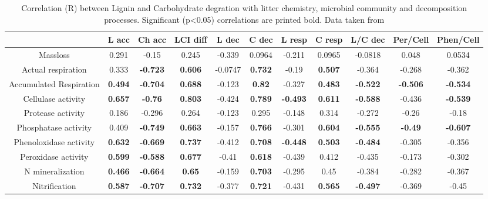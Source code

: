 \documentclass[authoryear,preprint,review,12pt]{elsarticle}
\begin{document}
\begin{table}[h!]
\begin{center}
\caption{Correlation (R) between Lignin and Carbohydrate degration with litter chemistry, microbial community and decomposition processes. Significant (p<0.05) correlations are printed bold. Data taken from \cite{Mooshammer2011, Leitner2011}}
\label{corrtable}
{\tiny
\begin{tabular}{ccccccccccc}
  \hline
 & L acc & Ch acc & LCI diff & L dec & C dec & L resp & C resp & L/C dec & Per/Cell & Phen/Cell \\ 
  \hline
Massloss & 0.291 & -0.15 & 0.245 & -0.339 & 0.0964 & -0.211 & 0.0965 & -0.0818 & 0.048 & 0.0534 \\ 
  Actual respiration & 0.333 & \textbf{ -0.723 } & \textbf{ 0.606 } & -0.0747 & \textbf{ 0.732 } & -0.19 & \textbf{ 0.507 } & -0.364 & -0.268 & -0.362 \\ 
  Accumulated Respiration & \textbf{ 0.494 } & \textbf{ -0.704 } & \textbf{ 0.688 } & -0.123 & \textbf{ 0.82 } & -0.327 & \textbf{ 0.483 } & \textbf{ -0.522 } & \textbf{ -0.506 } & \textbf{ -0.534 } \\ 
  Cellulase activity & \textbf{ 0.657 } & \textbf{ -0.76 } & \textbf{ 0.803 } & -0.424 & \textbf{ 0.789 } & \textbf{ -0.493 } & \textbf{ 0.611 } & \textbf{ -0.588 } & -0.436 & \textbf{ -0.539 } \\ 
  Protease activity & 0.186 & -0.296 & 0.264 & -0.123 & 0.295 & -0.148 & 0.314 & -0.272 & -0.26 & -0.18 \\ 
  Phosphatase activity & 0.409 & \textbf{ -0.749 } & \textbf{ 0.663 } & -0.157 & \textbf{ 0.766 } & -0.301 & \textbf{ 0.604 } & \textbf{ -0.555 } & \textbf{ -0.49 } & \textbf{ -0.607 } \\ 
  Phenoloxidase activity & \textbf{ 0.632 } & \textbf{ -0.669 } & \textbf{ 0.737 } & -0.412 & \textbf{ 0.708 } & \textbf{ -0.448 } & \textbf{ 0.503 } & \textbf{ -0.484 } & -0.305 & -0.356 \\ 
  Peroxidase activity & \textbf{ 0.599 } & \textbf{ -0.588 } & \textbf{ 0.677 } & -0.41 & \textbf{ 0.618 } & -0.439 & 0.412 & -0.435 & -0.173 & -0.302 \\ 
  N mineralization & \textbf{ 0.466 } & \textbf{ -0.664 } & \textbf{ 0.65 } & -0.159 & \textbf{ 0.703 } & -0.295 & 0.45 & -0.384 & -0.282 & -0.367 \\ 
  Nitrification & \textbf{ 0.587 } & \textbf{ -0.707 } & \textbf{ 0.732 } & -0.377 & \textbf{ 0.721 } & -0.431 & \textbf{ 0.565 } & \textbf{ -0.497 } & -0.369 & -0.45 \\ 

\end{tabular}}
\end{center}
\end{table}
\end{document}

